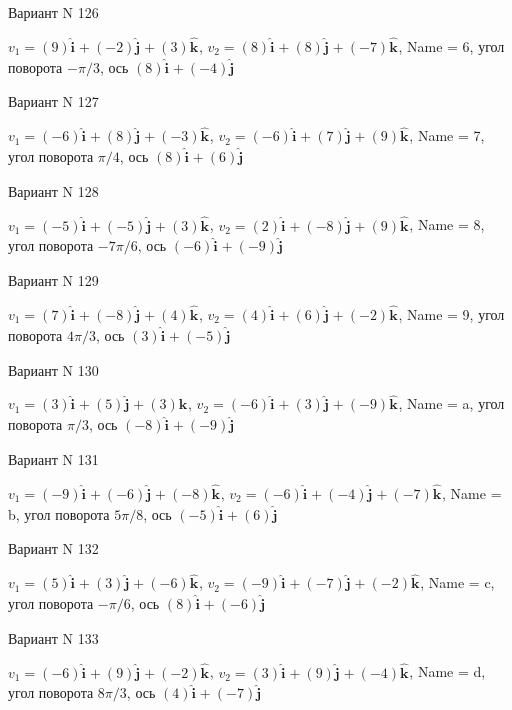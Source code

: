 \documentclass[11pt]{report}
\begin{document}
Вариант N 126

$v_1 = (9)\mathbf{\hat{i}_{}} + (-2)\mathbf{\hat{j}_{}} + (3)\mathbf{\hat{k}_{}}$, $v_2 = (8)\mathbf{\hat{i}_{}} + (8)\mathbf{\hat{j}_{}} + (-7)\mathbf{\hat{k}_{}}$, Name = 6, угол поворота $- \pi / 3$, ось $(8)\mathbf{\hat{i}_{}} + (-4)\mathbf{\hat{j}_{}}$

Вариант N 127

$v_1 = (-6)\mathbf{\hat{i}_{}} + (8)\mathbf{\hat{j}_{}} + (-3)\mathbf{\hat{k}_{}}$, $v_2 = (-6)\mathbf{\hat{i}_{}} + (7)\mathbf{\hat{j}_{}} + (9)\mathbf{\hat{k}_{}}$, Name = 7, угол поворота $\pi / 4$, ось $(8)\mathbf{\hat{i}_{}} + (6)\mathbf{\hat{j}_{}}$

Вариант N 128

$v_1 = (-5)\mathbf{\hat{i}_{}} + (-5)\mathbf{\hat{j}_{}} + (3)\mathbf{\hat{k}_{}}$, $v_2 = (2)\mathbf{\hat{i}_{}} + (-8)\mathbf{\hat{j}_{}} + (9)\mathbf{\hat{k}_{}}$, Name = 8, угол поворота $- 7 \pi / 6$, ось $(-6)\mathbf{\hat{i}_{}} + (-9)\mathbf{\hat{j}_{}}$

Вариант N 129

$v_1 = (7)\mathbf{\hat{i}_{}} + (-8)\mathbf{\hat{j}_{}} + (4)\mathbf{\hat{k}_{}}$, $v_2 = (4)\mathbf{\hat{i}_{}} + (6)\mathbf{\hat{j}_{}} + (-2)\mathbf{\hat{k}_{}}$, Name = 9, угол поворота $4 \pi / 3$, ось $(3)\mathbf{\hat{i}_{}} + (-5)\mathbf{\hat{j}_{}}$

Вариант N 130

$v_1 = (3)\mathbf{\hat{i}_{}} + (5)\mathbf{\hat{j}_{}} + (3)\mathbf{\hat{k}_{}}$, $v_2 = (-6)\mathbf{\hat{i}_{}} + (3)\mathbf{\hat{j}_{}} + (-9)\mathbf{\hat{k}_{}}$, Name = a, угол поворота $\pi / 3$, ось $(-8)\mathbf{\hat{i}_{}} + (-9)\mathbf{\hat{j}_{}}$

Вариант N 131

$v_1 = (-9)\mathbf{\hat{i}_{}} + (-6)\mathbf{\hat{j}_{}} + (-8)\mathbf{\hat{k}_{}}$, $v_2 = (-6)\mathbf{\hat{i}_{}} + (-4)\mathbf{\hat{j}_{}} + (-7)\mathbf{\hat{k}_{}}$, Name = b, угол поворота $5 \pi / 8$, ось $(-5)\mathbf{\hat{i}_{}} + (6)\mathbf{\hat{j}_{}}$

Вариант N 132

$v_1 = (5)\mathbf{\hat{i}_{}} + (3)\mathbf{\hat{j}_{}} + (-6)\mathbf{\hat{k}_{}}$, $v_2 = (-9)\mathbf{\hat{i}_{}} + (-7)\mathbf{\hat{j}_{}} + (-2)\mathbf{\hat{k}_{}}$, Name = c, угол поворота $- \pi / 6$, ось $(8)\mathbf{\hat{i}_{}} + (-6)\mathbf{\hat{j}_{}}$

Вариант N 133

$v_1 = (-6)\mathbf{\hat{i}_{}} + (9)\mathbf{\hat{j}_{}} + (-2)\mathbf{\hat{k}_{}}$, $v_2 = (3)\mathbf{\hat{i}_{}} + (9)\mathbf{\hat{j}_{}} + (-4)\mathbf{\hat{k}_{}}$, Name = d, угол поворота $8 \pi / 3$, ось $(4)\mathbf{\hat{i}_{}} + (-7)\mathbf{\hat{j}_{}}$
\end{document}
